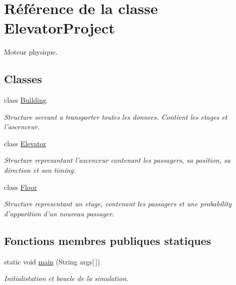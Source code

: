 \hypertarget{classElevatorProject}{\section{Référence de la classe Elevator\-Project}
\label{classElevatorProject}
}


Moteur physique.  


\subsection*{Classes}
\begin{DoxyCompactItemize}
\item 
class \hyperlink{classElevatorProject_1_1Building}{Building}
\begin{DoxyCompactList}\small\item\em Structure servant a transporter toutes les donnees. Contient les etages et l'ascenceur. \end{DoxyCompactList}\item 
class \hyperlink{classElevatorProject_1_1Elevator}{Elevator}
\begin{DoxyCompactList}\small\item\em Structure represantant l'ascenceur contenant les passagers, sa position, sa direction et son timing. \end{DoxyCompactList}\item 
class \hyperlink{classElevatorProject_1_1Floor}{Floor}
\begin{DoxyCompactList}\small\item\em Structure representant un etage, contenant les passagers et une probability d'apparition d'un nouveau passager. \end{DoxyCompactList}\end{DoxyCompactItemize}
\subsection*{Fonctions membres publiques statiques}
\begin{DoxyCompactItemize}
\item 
static void \hyperlink{classElevatorProject_a18ef2bd967dfa94e002e6faaf047300b}{main} (String args\mbox{[}$\,$\mbox{]})
\begin{DoxyCompactList}\small\item\em Initialistation et boucle de la simulation. \end{DoxyCompactList}\end{DoxyCompactItemize}
